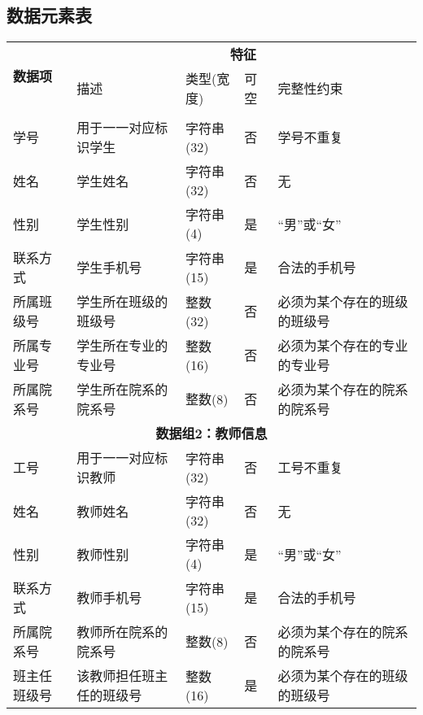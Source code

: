 \subsection{数据元素表}

\begin{center}
    \footnotesize
    \begin{longtable}{p{6em}p{16em}p{8em}@{}p{2em}p{16em}}
        \toprule
        \multirow{2}{*}{\textbf{数据项}} &
            \multicolumn{4}{c}{\textbf{特征}} \\
        \cmidrule{2-5}
        & 描述 & 类型(宽度) & 可空 & 完整性约束 \\
        \midrule
        \endhead
        \bottomrule
        \endfoot

        \multicolumn{5}{c}{\textbf{数据组1：学生信息}} \\
        \midrule
        学号 & 用于一一对应标识学生 & 字符串(32) & 否 & 学号不重复 \\
        姓名 & 学生姓名 & 字符串(32) & 否 & 无 \\
        性别 & 学生性别 & 字符串(4) & 是 & “男”或“女” \\
        联系方式 & 学生手机号 & 字符串(15) & 是 & 合法的手机号 \\
        所属班级号 & 学生所在班级的班级号 & 整数(32) & 否 & 必须为某个存在的班级的班级号 \\
        所属专业号 & 学生所在专业的专业号 & 整数(16) & 否 & 必须为某个存在的专业的专业号 \\
        所属院系号 & 学生所在院系的院系号 & 整数(8) & 否 & 必须为某个存在的院系的院系号 \\
        \midrule
        
        \multicolumn{5}{c}{\textbf{数据组2：教师信息}} \\
        \midrule
        工号 & 用于一一对应标识教师 & 字符串(32) & 否 & 工号不重复 \\
        姓名 & 教师姓名 & 字符串(32) & 否 & 无 \\
        性别 & 教师性别 & 字符串(4) & 是 & “男”或“女” \\
        联系方式 & 教师手机号 & 字符串(15) & 是 & 合法的手机号 \\
        所属院系号 & 教师所在院系的院系号 & 整数(8) & 否 & 必须为某个存在的院系的院系号 \\
        班主任班级号 & 该教师担任班主任的班级号 & 整数(16) & 是 & 必须为某个存在的班级的班级号 \\
        \midrule
        

\end{longtable}
\end{center}
